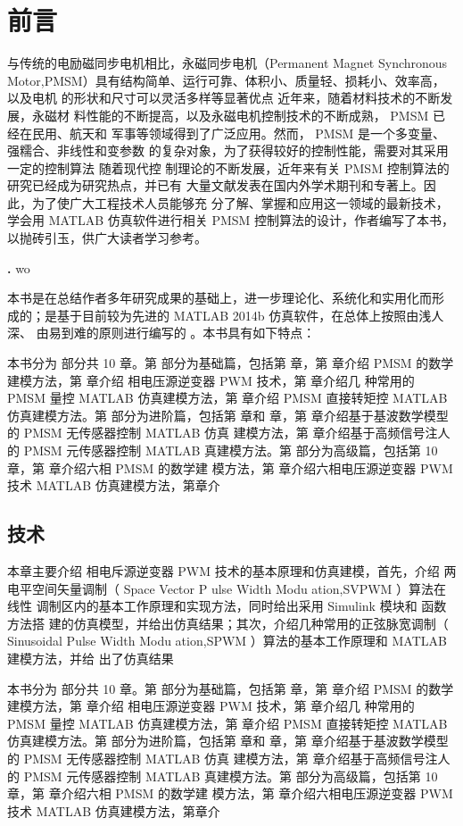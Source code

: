 \documentclass[normal,cn,hang,blue,ctexfont,chinese]{mycls}
\newcounter{exam}[chapter]
\renewcommand{\theexam}{\thechapter.\arabic{exam}}
\newenvironment{example}[1][]{
	 \refstepcounter{exam}
	 \par\noindent\textbf{\color{main}{\examplename} \theexam #1 }\rmfamily}{
	\par\ignorespacesafterend}
\begin{document}
\chapter{前言}
与传统的电励磁同步电机相比，永磁同步电机（Permanent Magnet Synchronous 
Motor,PMSM）具有结构简单、运行可靠、体积小、质量轻、损耗小、效率高，以及电机
的形状和尺寸可以灵活多样等显著优点 近年来，随着材料技术的不断发展，永磁材
料性能的不断提高，以及永磁电机控制技术的不断成熟， PMSM 已经在民用、航天和
军事等领域得到了广泛应用。然而， PMSM 是一个多变量、强糯合、非线性和变参数
的复杂对象，为了获得较好的控制性能，需要对其采用一定的控制算法 随着现代控
制理论的不断发展，近年来有关 PMSM 控制算法的研究已经成为研究热点，并已有
大量文献发表在国内外学术期刊和专著上。因此，为了使广大工程技术人员能够充
分了解、掌握和应用这一领域的最新技术，学会用 MATLAB 仿真软件进行相关
PMSM 控制算法的设计，作者编写了本书，以抛砖引玉，供广大读者学习参考。 

\begin{example}
	wo
\end{example}
本书是在总结作者多年研究成果的基础上，进一步理论化、系统化和实用化而形
成的；是基于目前较为先进的 MATLAB 2014b 仿真软件，在总体上按照由浅人深、
由易到难的原则进行编写的 。本书具有如下特点：

本书分为 部分共 10 章。第 部分为基础篇，包括第 章，第 章介绍
PMSM 的数学建模方法，第 章介绍 相电压源逆变器 PWM 技术，第 章介绍几
种常用的 PMSM 量控 MATLAB 仿真建模方法，第 章介绍 PMSM
直接转矩控 MATLAB 仿真建模方法。第 部分为进阶篇，包括第 章和
章，第 章介绍基于基波数学模型的 PMSM 无传感器控制 MATLAB 仿真
建模方法，第 章介绍基于高频信号注人的 PMSM 元传感器控制 MATLAB
真建模方法。第 部分为高级篇，包括第 10 章，第 章介绍六相 PMSM 的数学建
模方法，第 章介绍六相电压源逆变器 PWM 技术 MATLAB 仿真建模方法，第章介

\section{技术} 
	本章主要介绍 相电斥源逆变器 PWM 技术的基本原理和仿真建模，首先，介绍
	两电平空间矢量调制（ Space Vector P ulse Width Modu ation,SVPWM ）算法在线性
	调制区内的基本工作原理和实现方法，同时给出采用 Simulink 模块和 函数方法搭
	建的仿真模型，并给出仿真结果；其次，介绍几种常用的正弦脉宽调制（ Sinusoidal 
	Pulse Width Modu ation,SPWM ）算法的基本工作原理和 MATLAB 建模方法，并给
	出了仿真结果

		本书分为 部分共 10 章。第 部分为基础篇，包括第 章，第 章介绍
	PMSM 的数学建模方法，第 章介绍 相电压源逆变器 PWM 技术，第 章介绍几
	种常用的 PMSM 量控 MATLAB 仿真建模方法，第 章介绍 PMSM
	直接转矩控 MATLAB 仿真建模方法。第 部分为进阶篇，包括第 章和
	章，第 章介绍基于基波数学模型的 PMSM 无传感器控制 MATLAB 仿真
	建模方法，第 章介绍基于高频信号注人的 PMSM 元传感器控制 MATLAB
	真建模方法。第 部分为高级篇，包括第 10 章，第 章介绍六相 PMSM 的数学建
	模方法，第 章介绍六相电压源逆变器 PWM 技术 MATLAB 仿真建模方法，第章介
\end{document}
